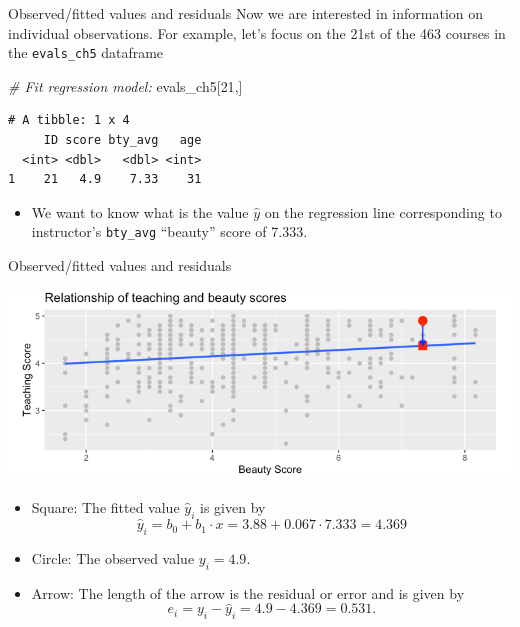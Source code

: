 \documentclass[
  ignorenonframetext,
]{beamer}
\newenvironment{Shaded}{\begin{snugshade}}{\end{snugshade}}
\newcommand{\CommentTok}[1]{\textcolor[rgb]{0.56,0.35,0.01}{\textit{#1}}}
\newcommand{\DecValTok}[1]{\textcolor[rgb]{0.00,0.00,0.81}{#1}}
\newcommand{\NormalTok}[1]{#1}
\providecommand{\tightlist}{%
  \setlength{\itemsep}{0pt}\setlength{\parskip}{0pt}}
\begin{document}
\begin{frame}[fragile]{Observed/fitted values and residuals}
\protect\hypertarget{observedfitted-values-and-residuals}{}
Now we are interested in information on individual observations. For
example, let's focus on the 21st of the 463 courses in the
\texttt{evals\_ch5} dataframe

\small

\begin{Shaded}
\begin{Highlighting}[]
\CommentTok{\# Fit regression model:}
\NormalTok{evals\_ch5[}\DecValTok{21}\NormalTok{,]}
\end{Highlighting}
\end{Shaded}

\begin{verbatim}
# A tibble: 1 x 4
     ID score bty_avg   age
  <int> <dbl>   <dbl> <int>
1    21   4.9    7.33    31
\end{verbatim}

\normalsize

\begin{itemize}
\tightlist
\item
  We want to know what is the value \(\hat{y}\) on the regression line
  corresponding to instructor's \texttt{bty\_avg} ``beauty'' score of
  7.333.
\end{itemize}
\end{frame}

\begin{frame}{Observed/fitted values and residuals}
\protect\hypertarget{observedfitted-values-and-residuals-1}{}
\begin{center}\includegraphics[width=0.8\linewidth,height=0.4\textheight]{week4_4} \end{center}

\begin{itemize}
\tightlist
\item
  Square: The fitted value \(\hat{y}_i\) is given by
  \[\hat{y}_i=b_0+b_1\cdot x=3.88+0.067\cdot 7.333=4.369\]
\item
  Circle: The observed value \(y_i=4.9\).
\item
  Arrow: The length of the arrow is the residual or error and is given
  by \[e_i=y_i-\hat{y}_i=4.9-4.369=0.531.\]
\end{itemize}
\end{frame}
\end{document}
